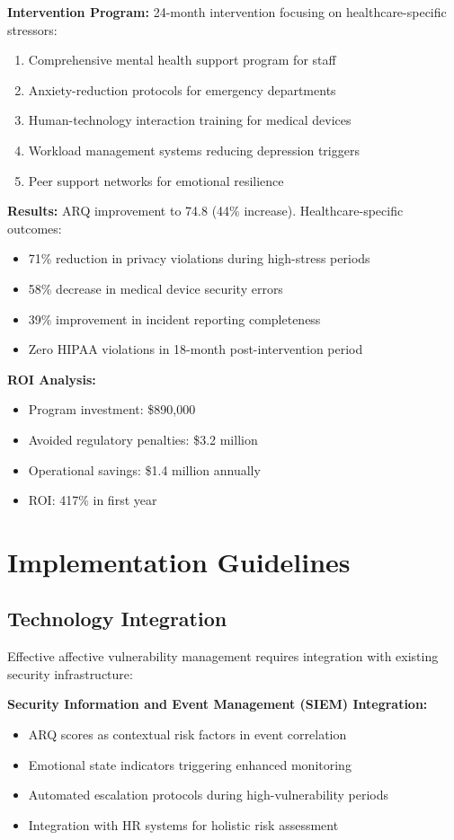 \documentclass[11pt,a4paper]{article}
\begin{document}
\textbf{Intervention Program:}
24-month intervention focusing on healthcare-specific stressors:
\begin{enumerate}
\item Comprehensive mental health support program for staff
\item Anxiety-reduction protocols for emergency departments
\item Human-technology interaction training for medical devices
\item Workload management systems reducing depression triggers
\item Peer support networks for emotional resilience
\end{enumerate}

\textbf{Results:}
ARQ improvement to 74.8 (44\% increase). Healthcare-specific outcomes:
\begin{itemize}
\item 71\% reduction in privacy violations during high-stress periods
\item 58\% decrease in medical device security errors
\item 39\% improvement in incident reporting completeness
\item Zero HIPAA violations in 18-month post-intervention period
\end{itemize}

\textbf{ROI Analysis:}
\begin{itemize}
\item Program investment: \$890,000
\item Avoided regulatory penalties: \$3.2 million
\item Operational savings: \$1.4 million annually
\item ROI: 417\% in first year
\end{itemize}

\section{Implementation Guidelines}

\subsection{Technology Integration}

Effective affective vulnerability management requires integration with existing security infrastructure:

\textbf{Security Information and Event Management (SIEM) Integration:}
\begin{itemize}
\item ARQ scores as contextual risk factors in event correlation
\item Emotional state indicators triggering enhanced monitoring
\item Automated escalation protocols during high-vulnerability periods
\item Integration with HR systems for holistic risk assessment
\end{itemize}
\end{document}
